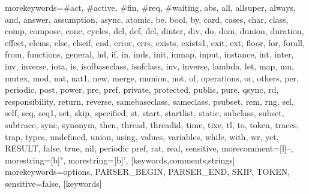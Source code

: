   {morekeywords={\#act, \#active, \#fin, \#req, \#waiting, abs, all, allsuper, always, and, answer, 
     assumption, async, atomic, be, bool, by, card, cases, char, class, comp, compose, conc, cycles,
     dcl, def, del, dinter, div, do, dom, dunion, duration, effect, elems, else, elseif, end,
     error, errs, exists, exists1, exit, ext, floor, for, forall, from, functions, 
     general, hd, if, in, inds, init, inmap, input, instance, int, inter, inv, inverse, iota, is, 
     isofbaseclass, isofclass, inv, inverse, lambda, let, map, mu, mutex, mod, nat, nat1, new, merge, 
     munion, not, of, operations, or, others, per, periodic, post, power, pre, pref, 
     private, protected, public, pure, qsync, rd, responsibility, return, reverse, samebaseclass, 
     sameclass, psubset, rem, rng, sel, self, seq, seq1, set, skip, specified, st, 
     start, startlist, static, subclass, subset, subtrace, sync, synonym, then, thread, 
     threadid, time, tixe, tl, to, token, traces, trap, types, undefined, union, using, values, 
     variables, while, with, wr, yet, RESULT, false, true, nil, periodic pref, rat, real},
   sensitive,
   morecomment=[l]--,
   morestring=[b]",
   morestring=[b]',
  }[keywords,comments,strings]
  {morekeywords={options, PARSER\_BEGIN, PARSER\_END, SKIP, TOKEN},
   sensitive=false,
  }[keywords]

